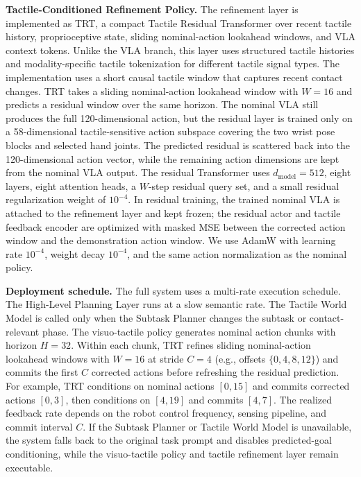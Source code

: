 \noindent\textbf{Tactile-Conditioned Refinement Policy.}
The refinement layer is implemented as TRT, a compact Tactile Residual Transformer over recent tactile history, proprioceptive state, sliding nominal-action lookahead windows, and VLA context tokens.
Unlike the VLA branch, this layer uses structured tactile histories and modality-specific tactile tokenization for different tactile signal types.
The implementation uses a short causal tactile window that captures recent contact changes.
TRT takes a sliding nominal-action lookahead window with $W=16$ and predicts a residual window over the same horizon.
The nominal VLA still produces the full 120-dimensional action, but the residual layer is trained only on a 58-dimensional tactile-sensitive action subspace covering the two wrist pose blocks and selected hand joints.
The predicted residual is scattered back into the 120-dimensional action vector, while the remaining action dimensions are kept from the nominal VLA output.
The residual Transformer uses $d_{\mathrm{model}}=512$, eight layers, eight attention heads, a $W$-step residual query set, and a small residual regularization weight of $10^{-4}$.
In residual training, the trained nominal VLA is attached to the refinement layer and kept frozen; the residual actor and tactile feedback encoder are optimized with masked MSE between the corrected action window and the demonstration action window.
We use AdamW with learning rate $10^{-4}$, weight decay $10^{-4}$, and the same action normalization as the nominal policy.

\noindent\textbf{Deployment schedule.}
The full system uses a multi-rate execution schedule.
The High-Level Planning Layer runs at a slow semantic rate.
The Tactile World Model is called only when the Subtask Planner changes the subtask or contact-relevant phase.
The visuo-tactile policy generates nominal action chunks with horizon $H=32$.
Within each chunk, TRT refines sliding nominal-action lookahead windows with $W=16$ at stride $C=4$ (e.g., offsets $\{0,4,8,12\}$) and commits the first $C$ corrected actions before refreshing the residual prediction.
For example, TRT conditions on nominal actions $[0,15]$ and commits corrected actions $[0,3]$, then conditions on $[4,19]$ and commits $[4,7]$.
The realized feedback rate depends on the robot control frequency, sensing pipeline, and commit interval $C$.
If the Subtask Planner or Tactile World Model is unavailable, the system falls back to the original task prompt and disables predicted-goal conditioning, while the visuo-tactile policy and tactile refinement layer remain executable.
